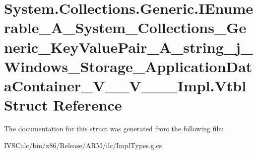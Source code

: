 \hypertarget{struct_system_1_1_collections_1_1_generic_1_1_i_enumerable___a___system___collections___generic_9ab11969c662903d78638c171adc1aff}{}\section{System.\+Collections.\+Generic.\+I\+Enumerable\+\_\+\+A\+\_\+\+System\+\_\+\+Collections\+\_\+\+Generic\+\_\+\+Key\+Value\+Pair\+\_\+\+A\+\_\+string\+\_\+j\+\_\+\+Windows\+\_\+\+Storage\+\_\+\+Application\+Data\+Container\+\_\+\+V\+\_\+\+\_\+\+V\+\_\+\+\_\+\+\_\+\+Impl.\+Vtbl Struct Reference}
\label{struct_system_1_1_collections_1_1_generic_1_1_i_enumerable___a___system___collections___generic_9ab11969c662903d78638c171adc1aff}


The documentation for this struct was generated from the following file\+:\begin{DoxyCompactItemize}
\item 
I\+V\+S\+Calc/bin/x86/\+Release/\+A\+R\+M/ilc/Impl\+Types.\+g.\+cs\end{DoxyCompactItemize}
